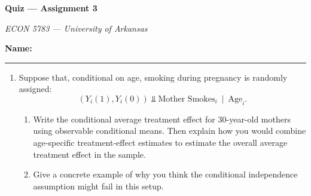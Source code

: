 \documentclass[12pt]{article}
\begin{document}
\begin{center}
  {\Huge\bf Quiz --- Assignment 3}
  
  \smallskip
  {\large\it ECON 5783 --- University of Arkansas}
\end{center}

\vspace{5mm}
\noindent\textbf{Name:} \rule{0.7\textwidth}{0.4pt}

\bigskip

\begin{enumerate}
  \item Suppose that, conditional on age, smoking during pregnancy is randomly assigned:
  $$
    \left( Y_i(1), Y_i(0) \right) \Perp \text{Mother Smokes}_i \ \mid \ \text{Age}_i.
  $$
  \begin{enumerate}
    \item[(a)] Write the conditional average treatment effect for 30-year-old mothers using observable conditional means.
    Then explain how you would combine age-specific treatment-effect estimates to estimate the overall average treatment effect in the sample.

    \vspace{2\bigskipamount}
    \item[(b)] Give a concrete example of why you think the conditional independence assumption might fail in this setup.
  \end{enumerate}
\end{enumerate}

% 
\end{document}
